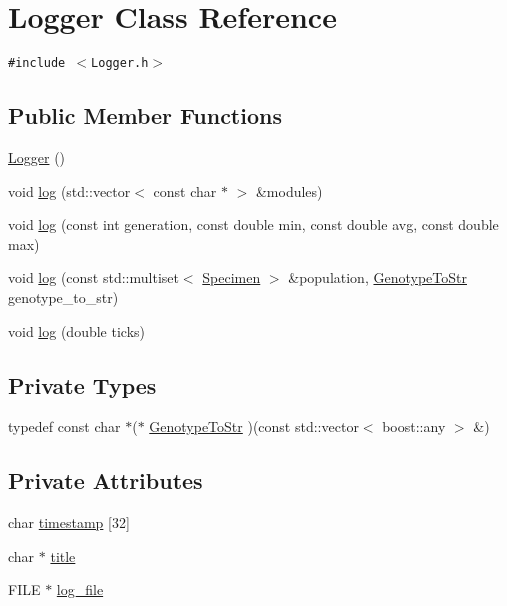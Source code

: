 \hypertarget{classLogger}{
\section{Logger Class Reference}
\label{classLogger}
}
{\tt \#include $<$Logger.h$>$}

\subsection*{Public Member Functions}
\begin{CompactItemize}
\item 
\hyperlink{classLogger_bc41bfb031d896170c7675fa96a6b30c}{Logger} ()
\item 
void \hyperlink{classLogger_cc5ac6b4ebecd839887041f08639151d}{log} (std::vector$<$ const char $\ast$ $>$ \&modules)
\item 
void \hyperlink{classLogger_a71ff6844276c6ad8f185355c702e45c}{log} (const int generation, const double min, const double avg, const double max)
\item 
void \hyperlink{classLogger_8db4457cb08db152c66515638d3194c6}{log} (const std::multiset$<$ \hyperlink{classSpecimen}{Specimen} $>$ \&population, \hyperlink{classLogger_3c460ae4390c61502216746ae9e78830}{GenotypeToStr} genotype\_\-to\_\-str)
\item 
void \hyperlink{classLogger_6cca2f66151bd00838489fde4b769a38}{log} (double ticks)
\end{CompactItemize}
\subsection*{Private Types}
\begin{CompactItemize}
\item 
typedef const char $\ast$($\ast$ \hyperlink{classLogger_3c460ae4390c61502216746ae9e78830}{GenotypeToStr} )(const std::vector$<$ boost::any $>$ \&)
\end{CompactItemize}
\subsection*{Private Attributes}
\begin{CompactItemize}
\item 
char \hyperlink{classLogger_34ba341a540e08e318113217fa524345}{timestamp} \mbox{[}32\mbox{]}
\item 
char $\ast$ \hyperlink{classLogger_2696e84480ff6728cd910a7cccb71eba}{title}
\item 
FILE $\ast$ \hyperlink{classLogger_acec0f07d337695de096830fe26709ef}{log\_\-file}
\end{CompactItemize}


